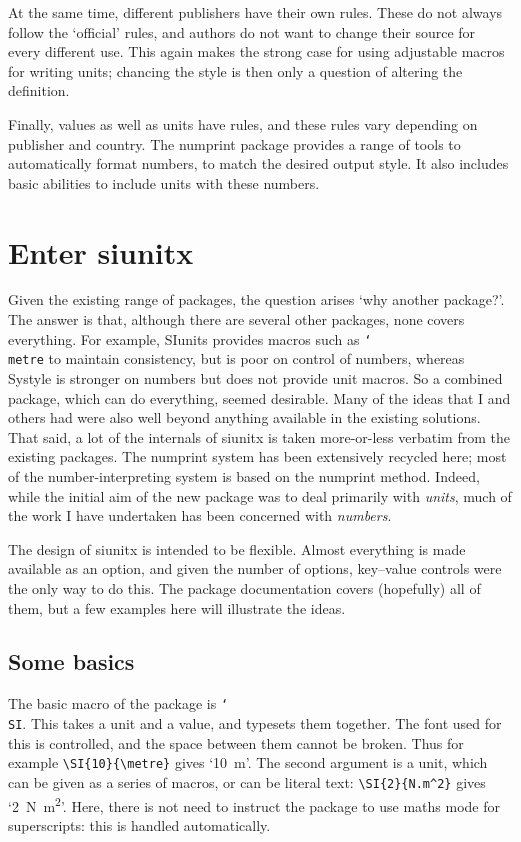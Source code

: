 \documentclass{article}
\providecommand*\cs[1]{\texttt{\char`\\#1}}
\providecommand*\pkg[1]{\textsf{#1}}
\begin{document}
At the same time, different publishers have their own rules.
These do not always follow the `official' rules, and authors
do not want to change their source for every different use.
This again makes the strong case for using adjustable macros
for writing units; chancing the style is then only a question
of altering the definition.

Finally, values as well as units have rules, and these rules
vary depending on publisher and country.  The \pkg{numprint}
package \cite{Harders2008} provides a range of tools to
automatically format numbers, to match the desired output
style.  It also includes basic abilities to include units with
these numbers.

\section{Enter \pkg{siunitx}}

Given the existing range of packages, the question arises `why
another package?'.  The answer is that, although there are
several other packages, none covers everything. For example,
\pkg{SIunits} provides macros such as \cs{metre} to maintain
consistency, but is poor on control of numbers, whereas
\pkg{Systyle} is stronger on numbers but does not provide unit
macros.  So a combined package, which can do everything, seemed
desirable.  Many of the ideas that I and others had were also
well beyond anything available in the existing solutions.  That
said, a lot of the internals of \pkg{siunitx} is taken
more-or-less verbatim from the existing packages.  The
\pkg{numprint} system has been extensively recycled here; most
of the number-interpreting system is based on the
\pkg{numprint} method.  Indeed, while the initial aim of the
new package was to deal primarily with \emph{units}, much of
the work I have undertaken has been concerned with
\emph{numbers}.

The design of \pkg{siunitx} is intended to be flexible.  Almost
everything is made available as an option, and given the number
of options, key--value controls were the only way to do this.
The package documentation covers (hopefully) all of them, but a
few examples here will illustrate the ideas.

\subsection{Some basics}

The basic macro of the package is \cs{SI}.  This takes a unit
and a value, and typesets them together.  The font used for
this is controlled, and the space between them cannot be
broken.  Thus for example \verb|\SI{10}{\metre}| gives
`\SI{10}{\metre}'.  The second argument is a unit, which can
be given as a series of macros, or can be literal text:
\verb|\SI{2}{N.m^2}| gives `\SI{2}{N.m^2}'.  Here, there is
not need to instruct the package to use maths mode for
superscripts: this is handled automatically.
\end{document}
